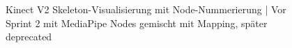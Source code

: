 \begin{figure}[htbp]
    \centering
    \caption{Kinect V2 Skeleton-Visualisierung mit Node-Nummerierung | Vor Sprint 2 mit MediaPipe Nodes gemischt mit Mapping, später deprecated}
    \label{fig:kinect_nodes}
\end{figure}

